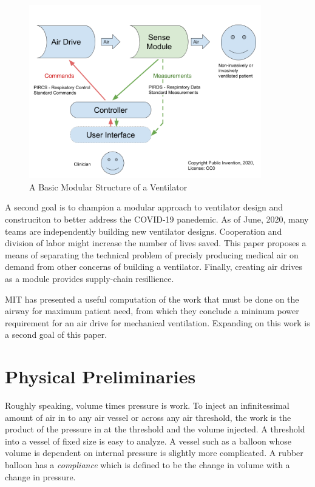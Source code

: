\documentclass{article}
\begin{document}
\begin{figure}
\begin{center}
\includegraphics[width=0.9\textwidth]{figures/BasicModules.png}
\caption{A Basic Modular Structure of a Ventilator}
\end{center}
\label{fig:basicmodules}
\end{figure}

A second goal is to champion a modular approach to ventilator design
and construciton to better address the COVID-19 panedemic. As of June, 2020,
many teams are independently building new ventilator designs. Cooperation
and division of labor might increase the number of lives saved.
This paper proposes a means of separating the technical problem of precisly
producing medical air on demand from other concerns of building a ventilator.
Finally, creating air drives as a module provides supply-chain resillience.


MIT has presented a useful computation of the work that must be done
on the airway for maximum patient need, from which they conclude a
mininum power requirement for an air drive for
mechanical ventilation\cite{mitpowercalculation}. Expanding on
this work is a second goal of this paper.


\section{Physical Preliminaries}

Roughly speaking, volume times pressure is work.
To inject an infinitessimal amount of air in
to any air vessel or across any air threshold,
the work is the product of the pressure in at the threshold and the
volume injected.
A threshold into a vessel of fixed size is easy to analyze.
A vessel such as a balloon whose volume is dependent on internal pressure
is slightly more complicated.
A rubber balloon has a {\em compliance} which is defined to be
the change in volume with a change in pressure.
\end{document}

